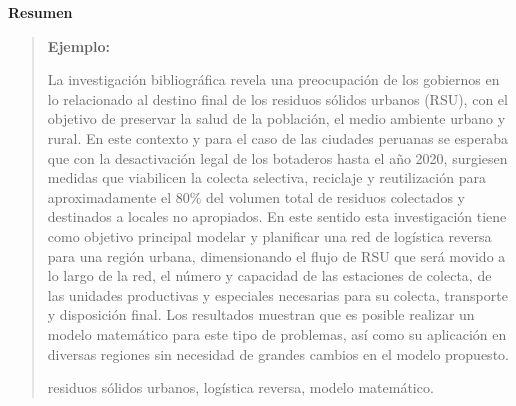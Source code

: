 \newpage
\begin{center}
 {\bf\LARGE Resumen}
\end{center} 
\vskip 0.5cm
\begin{quotation}
{\bf Ejemplo:}\par

La investigación bibliográfica revela una preocupación de los gobiernos en lo relacionado al destino final de los residuos sólidos urbanos (RSU), con el objetivo de preservar la salud de la población, el medio ambiente urbano y rural. En este contexto y para el caso de las ciudades peruanas se esperaba que con la desactivación legal de los botaderos hasta el año 2020, surgiesen medidas que viabilicen la colecta selectiva, reciclaje y reutilización para aproximadamente el $80\%$ del volumen total de residuos colectados y destinados a locales no apropiados. 
\vskip 0.2cm 
En este sentido esta investigación tiene como objetivo principal modelar y planificar una red de logística reversa para una región urbana, dimensionando el flujo de RSU que será movido a lo largo de la red, el número y capacidad de las estaciones de colecta, de las unidades productivas y especiales necesarias para su colecta, transporte y disposición final. Los resultados muestran que es posible realizar un modelo matemático para este tipo de problemas, así como su aplicación en diversas regiones sin necesidad de grandes cambios en el modelo propuesto.    

\vskip 0.3cm
\hspace*{-0.6cm}{\bf Palabras claves:} residuos sólidos urbanos, logística reversa, modelo matemático.
\end{quotation}


